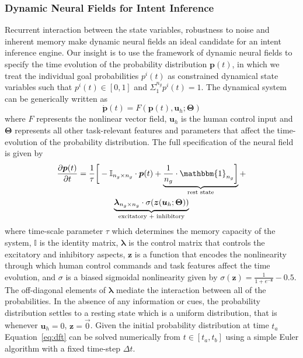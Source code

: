 \subsubsection{Dynamic Neural Fields for Intent Inference}\label{sssec:dft_ii}

Recurrent interaction between the state variables, 
robustness to noise and inherent memory make dynamic neural fields an ideal candidate for an intent inference engine. Our insight is to use the framework of dynamic neural fields to specify the time evolution of the probability distribution $\boldsymbol{p}(t)$, in which we treat the individual goal probabilities $p^i(t)$ as constrained dynamical state variables such that $p^i(t) \in [0, 1]$ and $\Sigma_{1}^{n_g}p^{i}(t) = 1$. The dynamical system can be generically written as 
\begin{equation}
\dot{\boldsymbol{p}}(t) = F(\boldsymbol{p}(t), \boldsymbol{u}_h ; \boldsymbol{\Theta})
\end{equation}
where $F$ represents the nonlinear vector field, $\boldsymbol{u}_h$ is the human control input and $\boldsymbol{\Theta}$ represents all other task-relevant features and parameters that affect the time-evolution of the probability distribution. 
The full specification of the neural field is given by
\begin{multline}\label{eq:dft}
\frac{\partial \boldsymbol{p}(t)}{\partial t} = \frac{1}{\tau}\bigg[-\mathbb{I}_{n_g\times n_g}\cdot\boldsymbol{p}(t) + \underbrace{\frac{1}{n_g}\cdot\mathbbm{1}_{n_g}\bigg]}_{\text{rest state}} + \\ \underbrace{\boldsymbol{\lambda}_{n_g\times n_g}\cdot\sigma(\boldsymbol{z}(\boldsymbol{u}_h;\boldsymbol{\Theta}))}_{\text{excitatory + inhibitory}}
\end{multline}
where time-scale parameter $\tau$ which determines the memory capacity of the system, $\mathbb{I}$ is the identity matrix, $\boldsymbol{\lambda}$ is the control matrix that controls the excitatory and inhibitory aspects, $\boldsymbol{z}$ is a function that encodes the nonlinearity through which human control commands and task features affect the time evolution, and $\sigma$ is a biased sigmoidal nonlinearity given by $\sigma(\boldsymbol{z}) = \frac{1}{1 + e^{-\boldsymbol{z}}} - 0.5$.
The off-diagonal elements of $\boldsymbol{\lambda}$ mediate the interaction between all of the probabilities. In the absence of any information or cues, the probability distribution settles to a resting state which is a uniform distribution, that is whenever $\boldsymbol{u}_h = 0$, $\boldsymbol{z} = \vec{0}$. Given the initial probability distribution at time $t_a$ Equation~\ref{eq:dft} can be solved numerically from $t \in [t_a, t_b]$ using a simple Euler algorithm with a fixed time-step $\Delta t$.

